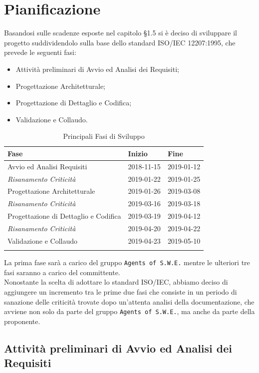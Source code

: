 \section{Pianificazione}

Basandosi sulle scadenze esposte nel capitolo §1.5 si è deciso di sviluppare il progetto suddividendolo sulla base dello standard ISO/IEC 12207:1995, che prevede le seguenti fasi:
\begin{itemize}
	\item Attività preliminari di Avvio ed Analisi dei Requisiti;
	\item Progettazione Architetturale;
	\item Progettazione di Dettaglio e Codifica;
	\item Validazione e Collaudo.
\end{itemize}

\begin{longtable}{|C{.46\textwidth}|C{.20\textwidth}|C{.20\textwidth}|}
\hline
\textbf{Fase} & \textbf{Inizio} & \textbf{Fine}\\
\hline \hline
\endfirsthead
\hline
Avvio ed Analisi Requisiti & 2018-11-15 & 2019-01-12 \\
\hline
\textit{Risanamento Criticità} & 2019-01-22 & 2019-01-25 \\
\hline
Progettazione Architetturale & 2019-01-26 & 2019-03-08 \\
\hline
\textit{Risanamento Criticità} & 2019-03-16 & 2019-03-18 \\
\hline
Progettazione di Dettaglio e Codifica & 2019-03-19 & 2019-04-12 \\
\hline
\textit{Risanamento Criticità} & 2019-04-20 & 2019-04-22 \\
\hline
Validazione e Collaudo & 2019-04-23 & 2019-05-10 \\
\hline
\caption{Principali Fasi di Sviluppo}
\label{Tabella Fasi di Sviluppo}
\end{longtable}

La prima fase sarà a carico del gruppo \texttt{Agents of S.W.E.} mentre le ulteriori tre fasi saranno a carico del committente. \\
Nonostante la scelta di adottare lo standard ISO/IEC, abbiamo deciso di aggiungere un incremento tra le prime due fasi che consiste in un periodo di sanazione delle criticità trovate dopo un'attenta analisi della documentazione, che avviene non solo da parte del gruppo \texttt{Agents of S.W.E.}, ma anche da parte della proponente. 

\subsection{Attività preliminari di Avvio ed Analisi dei Requisiti}

